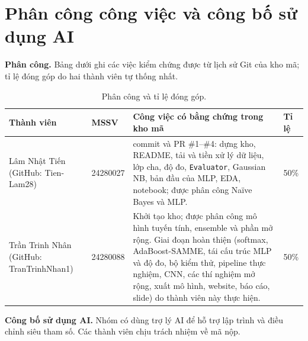 \section{Phân công công việc và công bố sử dụng AI}
\label{sec:contrib}
\textbf{Phân công.} Bảng dưới ghi các việc kiểm chứng được từ lịch sử Git của kho mã; tỉ lệ đóng góp do hai thành viên tự thống nhất.

\begin{table}[H]
\centering\small
\begin{tabular}{@{}>{\raggedright\arraybackslash}p{3.3cm}p{1.9cm}>{\raggedright\arraybackslash}p{7.6cm}p{1.1cm}@{}}
\toprule
Thành viên & MSSV & Công việc có bằng chứng trong kho mã & Tỉ lệ \\
\midrule
Lâm Nhật Tiến (GitHub: Tien-Lam28) & 24280027 &
23 commit và PR \#1--\#4: dựng kho, README, tải và tiền xử lý dữ liệu, lớp cha, độ đo, \texttt{Evaluator}, Gaussian NB, bản đầu của MLP, EDA, notebook; được phân công Naïve Bayes và MLP. & 50\% \\
\addlinespace
Trần Trinh Nhân (GitHub: TranTrinhNhan1) & 24280088 &
Khởi tạo kho; được phân công mô hình tuyến tính, ensemble và phần mở rộng. Giai đoạn hoàn thiện (softmax, AdaBoost-SAMME, tái cấu trúc MLP và độ đo, bộ kiểm thử, pipeline thực nghiệm, CNN, các thí nghiệm mở rộng, xuất mô hình, website, báo cáo, slide) do thành viên này thực hiện. & 50\% \\
\bottomrule
\end{tabular}
\caption{Phân công và tỉ lệ đóng góp.}
\end{table}

\textbf{Công bố sử dụng AI.} Nhóm có dùng trợ lý AI để hỗ trợ lập trình và điều chỉnh siêu tham số. Các thành viên chịu trách nhiệm về mã nộp.
